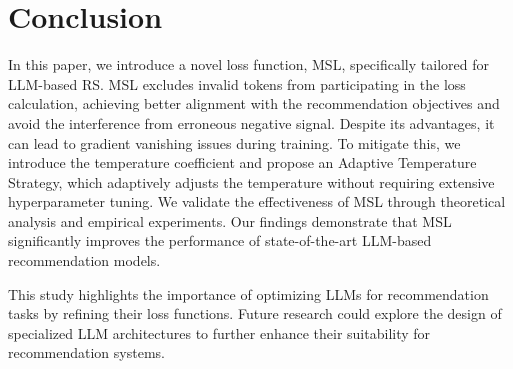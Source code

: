 \documentclass[sigconf,natbib=true]{acmart}
\begin{document}
\section{Conclusion}
In this paper, we introduce a novel loss function, MSL, specifically tailored for LLM-based RS. MSL excludes invalid tokens from participating in the loss calculation, achieving better alignment with the recommendation objectives and avoid the interference from
erroneous negative signal. Despite its advantages, it can lead to gradient vanishing issues during training. To mitigate this, we introduce the temperature coefficient and propose an Adaptive Temperature Strategy, which adaptively adjusts the temperature without requiring extensive hyperparameter tuning. We validate the effectiveness of MSL through theoretical analysis and empirical experiments. Our findings demonstrate that MSL significantly improves the performance of state-of-the-art LLM-based recommendation models.

This study highlights the importance of optimizing LLMs for recommendation tasks by refining their loss functions. Future research could explore the design of specialized LLM architectures to further enhance their suitability for recommendation systems.

\end{document}
